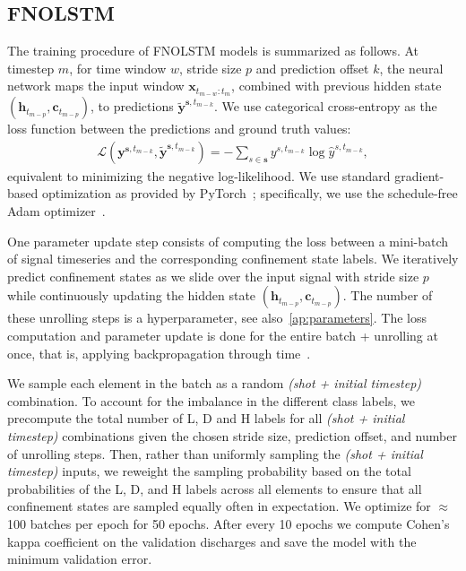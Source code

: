 \subsection{FNOLSTM}
The training procedure of FNOLSTM models is summarized as follows. At timestep $m$, for time window $w$, stride size $p$ and prediction offset $k$, the neural network maps the input window $\mathbf{x}_{t_{m-w}:t_m}$, combined with previous hidden state $(\mathbf{h}_{t_{m-p}}, \mathbf{c}_{t_{m-p}})$, to predictions $\mathbf{\widetilde{y}}^{\mathbf{s},t_{m-k}}$. We use categorical cross-entropy as the loss function between the predictions and ground truth values: 
\begin{align}
\mathcal{L}(\mathbf{y}^{\mathbf{s},t_{m-k}}, \mathbf{\widetilde{y}}^{\mathbf{s},t_{m-k}}) = -\sum_{s \in \mathbf{s}} y^{s,t_{m-k}} \log \hat{y}^{s,t_{m-k}},\label{eq:cce}
\end{align}
equivalent to minimizing the negative log-likelihood. We use standard gradient-based optimization as provided by PyTorch~\cite{paszke2019}; specifically, we use the schedule-free Adam optimizer~\cite{defazio2024}. 

One parameter update step consists of computing the loss between a mini-batch of signal timeseries and the corresponding confinement state labels. We iteratively predict confinement states as we slide over the input signal with stride size $p$ while continuously updating the hidden state $(\mathbf{h}_{t_{m-p}}, \mathbf{c}_{t_{m-p}})$. The number of these unrolling steps is a hyperparameter, see also~\ref{ap:parameters}. The loss computation and parameter update is done for the entire batch + unrolling at once, that is, applying backpropagation through time~\cite{werbos1988}.

We sample each element in the batch as a random \textit{(shot + initial timestep)} combination. To account for the imbalance in the different class labels, we precompute the total number of L, D and H labels for all \textit{(shot + initial timestep)} combinations given the chosen stride size, prediction offset, and number of unrolling steps. Then, rather than uniformly sampling the \textit{(shot + initial timestep)} inputs, we reweight the sampling probability based on the total probabilities of the L, D, and H labels across all elements to ensure that all confinement states are sampled equally often in expectation. We optimize for $\approx$100 batches per epoch for 50 epochs. After every 10 epochs we compute Cohen's kappa coefficient on the validation discharges and save the model with the minimum validation error.


